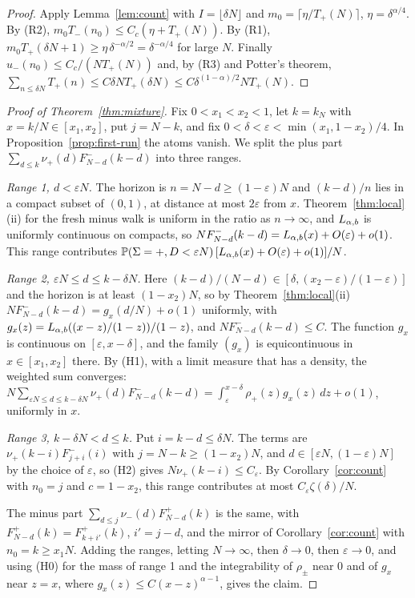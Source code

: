 \begin{proof}
Apply Lemma~\ref{lem:count} with $I=\lfloor\delta N\rfloor$ and $m_0=\lceil\eta/T_\plus(N)\rceil$,
$\eta=\delta^{\alpha/4}$. By (R2), $m_0T_\minus(n_0)\le C_c(\eta+T_\plus(N))$. By (R1),
$m_0T_\plus(\delta N+1)\ge\eta\,\delta^{-\alpha/2}=\delta^{-\alpha/4}$ for large $N$. Finally
$u_\minus(n_0)\le C_c/(NT_\plus(N))$ and, by (R3) and Potter's theorem,
$\sum_{n\le\delta N}T_\plus(n)\le C\delta NT_\plus(\delta N)\le C\delta^{(1-\alpha)/2}NT_\plus(N)$.
\end{proof}

\begin{proof}[Proof of Theorem~\ref{thm:mixture}]
Fix $0<x_1<x_2<1$, let $k=k_N$ with $x=k/N\in[x_1,x_2]$, put $j=N-k$, and fix
$0<\delta<\varepsilon<\min(x_1,1-x_2)/4$. In Proposition~\ref{prop:first-run} the atoms vanish.
We split the plus part $\sum_{d\le k}\nu_\plus(d)F^\minus_{N-d}(k-d)$ into three ranges.

\emph{Range 1, $d<\varepsilon N$.} The horizon is $n=N-d\ge(1-\varepsilon)N$ and $(k-d)/n$ lies in a
compact subset of $(0,1)$, at distance at most $2\varepsilon$ from $x$. Theorem~\ref{thm:local}(ii)
for the fresh minus walk is uniform in the ratio as $n\to\infty$, and $L_{\alpha,b}$ is uniformly
continuous on compacts, so $NF^{-}_{N-d}(k-d)=L_{\alpha,b}(x)+O(\varepsilon)+o(1)$. This range contributes
$\mathbb{P}(\Sigma={+},D<\varepsilon N)\,[L_{\alpha,b}(x)+O(\varepsilon)+o(1)]/N$.

\emph{Range 2, $\varepsilon N\le d\le k-\delta N$.} Here $(k-d)/(N-d)\in[\delta,(x_2-\varepsilon)/(1-\varepsilon)]$
and the horizon is at least $(1-x_2)N$, so by Theorem~\ref{thm:local}(ii)
$NF^\minus_{N-d}(k-d)=g_x(d/N)+o(1)$ uniformly, with
$g_x(z)=L_{\alpha,b}((x-z)/(1-z))/(1-z)$, and $NF^\minus_{N-d}(k-d)\le C$. The function $g_x$ is continuous
on $[\varepsilon,x-\delta]$, and the family $(g_x)$ is equicontinuous in $x\in[x_1,x_2]$ there. By
(H1), with a limit measure that has a density, the weighted sum converges:
$N\sum_{\varepsilon N\le d\le k-\delta N}\nu_\plus(d)F^\minus_{N-d}(k-d)=\int_\varepsilon^{x-\delta}\rho_\plus(z)g_x(z)\,dz+o(1)$,
uniformly in $x$.

\emph{Range 3, $k-\delta N<d\le k$.} Put $i=k-d\le\delta N$. The terms are
$\nu_\plus(k-i)F^\minus_{j+i}(i)$ with $j=N-k\ge(1-x_2)N$, and $d\in[\varepsilon N,(1-\varepsilon)N]$ by
the choice of $\varepsilon$, so (H2) gives $N\nu_\plus(k-i)\le C_\varepsilon$. By
Corollary~\ref{cor:count} with $n_0=j$ and $c=1-x_2$, this range contributes at most
$C_\varepsilon\zeta(\delta)/N$.

The minus part $\sum_{d\le j}\nu_\minus(d)F^\plus_{N-d}(k)$ is the same, with
$F^\plus_{N-d}(k)=F^\plus_{k+i'}(k)$, $i'=j-d$, and the mirror of Corollary~\ref{cor:count} with
$n_0=k\ge x_1N$. Adding the ranges, letting $N\to\infty$, then $\delta\to0$, then $\varepsilon\to0$,
and using (H0) for the mass of range 1 and the integrability of $\rho_\pm$ near $0$ and of
$g_x$ near $z=x$, where $g_x(z)\le C(x-z)^{\alpha-1}$, gives the claim.
\end{proof}

